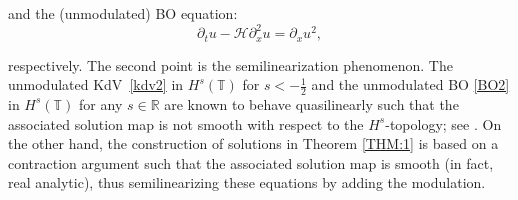 \documentclass[letterpaper, 11pt,  reqno]{amsart}
\newcommand{\1}{\hspace{0.5mm}\text{I}\hspace{0.5mm}}
\newcommand{\noi}{\noindent}
\newcommand{\R}{\mathbb{R}}
\newcommand{\T}{\mathbb{T}}
\renewcommand{\H}{\mathcal{H}}
\newcommand{\dx}{\partial_x}
\newcommand{\dt}{\partial_t}
\numberwithin{equation}{section}
\numberwithin{theorem}{section}
\begin{document}
\noi
and 
the (unmodulated) BO equation:
\begin{equation}
\label{BO2}
\dt u-    \H\dx^2 u  =\dx u^2,
\end{equation}

\noi
respectively.
The second point is the 
 semilinearization phenomenon.
The unmodulated 
KdV~\eqref{kdv2}
in $H^s(\T)$ for $s <  - \frac 12$
and
the unmodulated BO \eqref{BO2}
in $H^s(\T)$
 for  any $s \in \R$
are known to behave quasilinearly
such that 
the associated solution map 
is not smooth with respect to the $H^s$-topology;
see  \cite{BO97, MST, CCT,  GKT24}.
On the other hand, 
the construction of solutions in 
Theorem \ref{THM:1} 
is 
 based on a contraction argument
 such that the associated solution map
 is smooth (in fact, real analytic), 
thus  semilinearizing 
these equations
by adding  the modulation.
\end{document}
